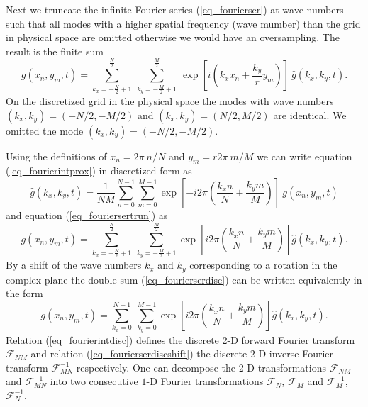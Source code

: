 Next we truncate the infinite Fourier series (\ref{eq_fourierser}) 
at wave numbers such that all modes with a higher spatial frequency 
(wave mumber) than the grid in physical space are omitted otherwise
we would have an oversampling. The result is the finite sum
\begin{equation} \label{eq_fouriersertrun}
  g(x_{n},y_{m},t) 
   =  
  \sum_{k_{x} = -\frac{N}{2}+1}^{\frac{N}{2}} \ 
  \sum_{k_{y} = -\frac{M}{2}+1}^{\frac{M}{2}} \
   \exp
   \left[ 
    i \left(k_{x} x_{n} + \frac{k_{y}}{r} y_{m} \right)
   \right] \
   \hat{g}(k_{x},k_{y},t).
\end{equation}
On the discretized grid in the physical space the modes with wave numbers 
$(k_{x},k_{y}) = (-N/2,-M/2)$ and $(k_{x},k_{y}) = (N/2,M/2)$ are 
identical. We omitted the mode $(k_{x},k_{y}) = (-N/2,-M/2)$.

Using the definitions of $x_{n} = 2 \pi \ n/N$ and $y_{m} = r 2 \pi \ m/M$ 
we can write equation (\ref{eq_fourierintprox}) in discretized form as
\begin{equation} \label{eq_fourierintdisc}
  \hat{g}(k_{x},k_{y},t)
   = 
  \frac{1}{NM} 
   \sum_{n = 0}^{N-1}
    \sum_{m = 0}^{M-1}
     \exp 
      \left[
       -i 2 \pi 
        \left( 
         \frac{k_{x} n}{N} + \frac{k_{y} m}{M}
        \right)
      \right]
      \ g(x_{n},y_{m},t)
\end{equation}
and equation (\ref{eq_fouriersertrun}) as
\begin{equation} \label{eq_fourierserdisc}
  g(x_{n},y_{m},t)
   = 
   \sum_{k_{x}= -\frac{N}{2}+1}^{\frac{N}{2}}
    \ 
    \sum_{k_{y}= -\frac{M}{2}+1}^{\frac{M}{2}}
     \exp 
      \left[ 
        i 2 \pi 
        \left( 
         \frac{k_{x} n}{N} + \frac{k_{y} m}{M}
        \right) 
      \right]
    \hat{g}(k_{x},k_{y},t).
\end{equation}
By a shift of the wave numbers $k_{x}$ and $k_{y}$ corresponding to a rotation 
in the complex plane the double sum (\ref{eq_fourierserdisc}) can be written
equivalently in the form
\begin{equation} \label{eq_fourierserdiscshift}
  g(x_{n},y_{m},t)
   = 
   \sum_{k_{x}= 0}^{N-1}
    \ 
    \sum_{k_{y}= 0}^{M-1}
     \exp 
      \left[ 
        i 2 \pi 
        \left( 
         \frac{k_{x} n}{N} + \frac{k_{y} m}{M}
        \right) 
      \right]
    \hat{g}(k_{x},k_{y},t).
\end{equation}
Relation (\ref{eq_fourierintdisc}) defines the discrete $2$-D
forward Fourier transform $\mathcal{F}_{NM}$ and relation 
(\ref{eq_fourierserdiscshift}) the discrete $2$-D inverse Fourier 
transform $\mathcal{F}^{-1}_{MN}$ respectively. One can decompose the 
$2$-D transformations $\mathcal{F}_{NM}$ and $\mathcal{F}^{-1}_{MN}$ 
into two consecutive $1$-D Fourier transformations $\mathcal{F}_{N}$, 
$\mathcal{F}_{M}$ and $\mathcal{F}^{-1}_{M}$, $\mathcal{F}^{-1}_{N}$. 

